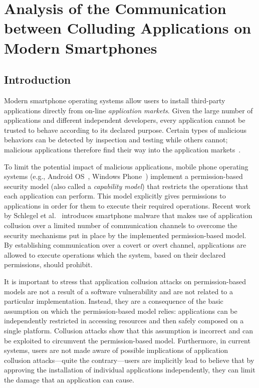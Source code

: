 \chapter[Communication Channels between Colluding Applications]{Analysis of the Communication between Colluding Applications on
  Modern Smartphones}
\label{chap:sp_appcollusion}

\newcommand{\noinch}[1]{\noindent \emph{#1:}}

\section{Introduction}

Modern smartphone operating systems allow users to install third-party
applications directly from on-line \emph{application markets}. Given
the large number of applications and different independent developers,
every application cannot be trusted to behave according to its
declared purpose. Certain types of malicious behaviors can be detected
by inspection and testing while others cannot; malicious applications
therefore find their way into the application
markets~\cite{Stajano_inglorious_installers,Android_malware_Oberhide,Mobile_harder_than_fixed,App_centric_android_security}.

To limit the potential impact of malicious applications, mobile phone
operating systems (e.g., Android OS~\cite{os-android}, Windows Phone~\cite{os-wp7}) implement a
permission-based security model (also called a \emph{capability
  model}) that restricts the operations that each application can
perform. This model explicitly gives permissions to applications in
order for them to execute their required operations. Recent work by
Schlegel et al.~\cite{soundcomber-ndss} introduces smartphone malware
that makes use of application collusion over a limited number of
communication channels to overcome the security mechanisms put in
place by the implemented permission-based model. By establishing
communication over a covert or overt channel, applications are allowed
to execute operations which the system, based on their declared
permissions, should prohibit.

It is important to stress that application collusion attacks on
permission-based models are not a result of a software vulnerability
and are not related to a particular implementation. Instead, they are
a consequence of the basic assumption on which the permission-based
model relies: applications can be independently restricted in
accessing resources and then safely composed on a single
platform. Collusion attacks show that this assumption is incorrect and
can be exploited to circumvent the permission-based
model. Furthermore, in current systems, users are not made aware of
possible implications of application collusion attacks---quite the
contrary---users are implicitly lead to believe that by approving the
installation of individual applications independently, they can limit
the damage that an application can cause.

